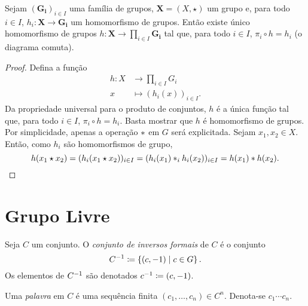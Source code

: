 \begin{prop}
Sejam $(\bm{G_i})_{i \in I}$ uma família de grupos, $\bm X = (X,\star)$ um grupo e, para todo $i \in I$, $h_i: \bm X \to \bm{G_i}$ um homomorfismo de grupos. Então existe único homomorfismo de grupos $h: \bm X \to \prod_{i \in I} \bm{G_i}$ tal que, para todo $i \in I$, $\pi_i \circ h = h_i$ (o diagrama comuta).
\begin{figure}[!h]
\centering
{}
\end{figure}
\end{prop}
\begin{proof}
Defina a função
	\begin{align*}
	h: X &\to \prod_{i \in I} G_i \\
		x &\mapsto (h_i(x))_{i \in I}.
	\end{align*}
Da propriedade universal para o produto de conjuntos, $h$ é a única função tal que, para todo $i \in I$, $\pi_i \circ h = h_i$. Basta mostrar que $h$ é homomorfismo de grupos. Por simplicidade, apenas a operação $\ast$ em $G$ será explicitada. Sejam $x_1,x_2 \in X$. Então, como $h_i$ são homomorfismos de grupo,
	\begin{equation*}
	h(x_1 \star x_2) = (h_i(x_1 \star x_2))_{i \in I} = (h_i(x_1) \ast_i h_i(x_2))_{i \in I} = h(x_1) \ast h(x_2).
	\end{equation*}
\end{proof}

\section{Grupo Livre}

\begin{defi}
Seja $C$ um conjunto. O \emph{conjunto de inversos formais} de $C$ é o conjunto
	\begin{equation*}
	C^{-1} \coloneqq \left\{(c,-1) \;\middle\vert\; c \in G \right\}.
	\end{equation*}
Os elementos de $C^{-1}$ são denotados $c^{-1} \coloneqq (c,-1)$.

Uma \emph{palavra} em $C$ é uma sequência finita $(c_1,\ldots,c_n) \in C^n$. Denota-se $c_1 \cdots c_n$.
\end{defi}

